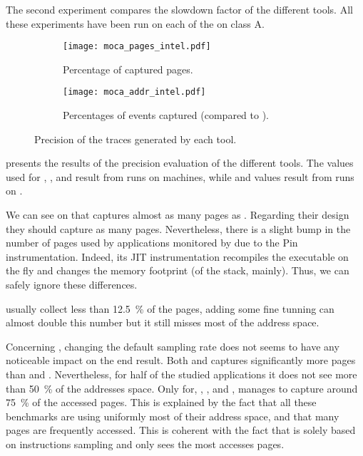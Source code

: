 The second experiment compares the
slowdown factor of the different tools.  All these experiments have been run on each of the \NPB on class A.

\begin{figure}[htb]
    \centering
    \begin{subfigure}{\linewidth}
        \texttt{[image: moca\_pages\_intel.pdf]}
        \caption{Percentage of captured pages.}
        \label{fig:pages}
    \end{subfigure}
    \begin{subfigure}{\linewidth}
        \texttt{[image: moca\_addr\_intel.pdf]}
        \caption{Percentages of events captured (compared to \Moca).}
        \label{fig:addr}
    \end{subfigure}
    \caption{Precision of the traces generated by each tool.}
    \label{fig:pages-addr}
\end{figure}

 presents the results of the precision evaluation of the
different tools. The values used for \Mitos, \MitosTun, \Moca and
\TABARNAC result from runs on \Edel machines, while \MemProf and \MemProfTun values result from runs on
\Stremi.

We can see on  that \Moca captures almost as many pages as \TABARNAC.
Regarding their design they should capture as many pages. Nevertheless, there is a slight
bump in the number of pages used by applications monitored by \TABARNAC due to the Pin instrumentation.
Indeed, its JIT instrumentation recompiles the executable on the fly and changes the memory footprint
(of the stack, mainly). Thus, we can safely ignore these differences.

\Mitos usually collect less than \SI{12.5}{\%} of the pages, adding some fine tunning
can almost double this number but it still misses most of the address space.

Concerning \MemProf, changing the default sampling rate does not seems to
have any noticeable impact on the end result. Both \MemProf and \MemProfTun captures significantly more pages than
\Mitos and \MitosTun. Nevertheless, for half of the studied applications it does
not see more than \SI{50}{\%} of the addresses space. Only for, \BT, \LU, \SP and \UA,
\MemProf manages to capture around \SI{75}{\%} of the accessed pages. This is explained by the fact that all these
benchmarks are using uniformly most of their address space, and that many pages are frequently accessed.
This is coherent with the fact that \MemProf is solely based on instructions sampling and only sees the most accesses pages.

